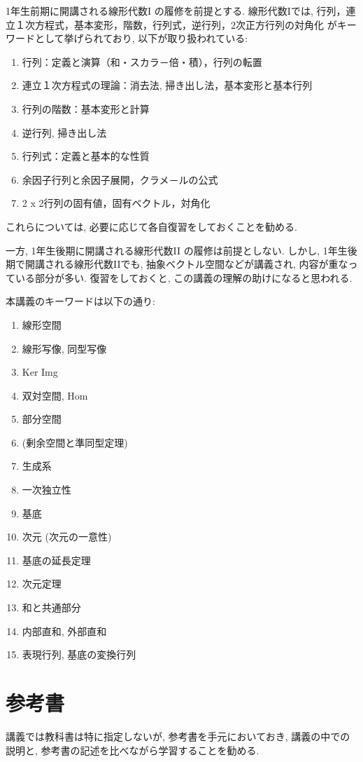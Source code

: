 1年生前期に開講される線形代数I
の履修を前提とする.
線形代数Iでは,
行列，連立１次方程式，基本変形，階数，行列式，逆行列，$2$次正方行列の対角化
がキーワードとして挙げられており,
以下が取り扱われている:
\begin{enumerate}
\item 行列：定義と演算（和・スカラ－倍・積），行列の転置
\item 連立１次方程式の理論：消去法, 掃き出し法，基本変形と基本行列
\item 行列の階数：基本変形と計算
\item 逆行列, 掃き出し法
\item 行列式：定義と基本的な性質
\item 余因子行列と余因子展開，クラメ－ルの公式
\item 2 x 2行列の固有値，固有ベクトル，対角化
\end{enumerate}
これらについては,
必要に応じて各自復習をしておくことを勧める.

一方,
1年生後期に開講される線形代数II
の履修は前提としない.
しかし,
1年生後期で開講される線形代数IIでも,
抽象ベクトル空間などが講義され,
内容が重なっている部分が多い.
復習をしておくと,
この講義の理解の助けになると思われる.

本講義のキーワードは以下の通り:
\begin{enumerate}
\item 線形空間
\item 線形写像, 同型写像
\item Ker Img
\item 双対空間, Hom
\item 部分空間
\item (剰余空間と準同型定理)
\item 生成系
\item 一次独立性
\item 基底
\item 次元 (次元の一意性)
\item 基底の延長定理
\item 次元定理
\item 和と共通部分
\item 内部直和, 外部直和
\item 表現行列, 基底の変換行列
\end{enumerate}

\section{参考書}
講義では教科書は特に指定しないが,
参考書を手元においておき,
講義の中での説明と,
参考書の記述を比べながら学習することを勧める.

